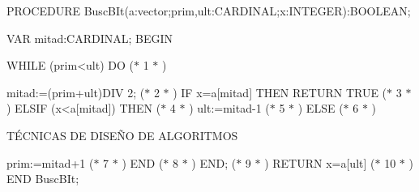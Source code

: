 \documentclass[12pt]{article}
\renewcommand{\_}{\kern-1.5pt\textunderscore\kern-1.5pt}
\begin{document}
\begin{adjustwidth}{0.97in}{0.66in}
{\fontsize{10pt}{12.0pt}\selectfont PROCEDURE BuscBIt(a:vector;prim,ult:CARDINAL;x:INTEGER):BOOLEAN; \par}\par

\end{adjustwidth}

\begin{adjustwidth}{0.97in}{3.72in}
{\fontsize{10pt}{12.0pt}\selectfont VAR mitad:CARDINAL; BEGIN \par}\par

\end{adjustwidth}

\begin{adjustwidth}{1.17in}{1.84in}
{\fontsize{10pt}{12.0pt}\selectfont WHILE (prim<ult) DO ($\ast$  1 $\ast$ ) \par}\par

\end{adjustwidth}

\begin{adjustwidth}{1.36in}{1.74in}
\begin{FlushRight}
{\fontsize{10pt}{12.0pt}\selectfont mitad:=(prim+ult)DIV 2; ($\ast$  2 $\ast$ ) IF x=a[mitad] THEN RETURN TRUE ($\ast$  3 $\ast$ ) ELSIF (x<a[mitad]) THEN ($\ast$  4 $\ast$ ) ult:=mitad-1 ($\ast$  5 $\ast$ ) ELSE ($\ast$  6 $\ast$ ) \par}
\end{FlushRight}\par

\end{adjustwidth}

{\fontsize{10pt}{12.0pt} {\fontsize{7pt}{8.4pt}\selectfont TÉCNICAS DE DISEÑO DE ALGORITMOS \par}\par}\par

\begin{FlushRight}
{\fontsize{10pt}{12.0pt}\selectfont prim:=mitad+1 ($\ast$  7 $\ast$ ) END ($\ast$  8 $\ast$ ) END; ($\ast$  9 $\ast$ ) RETURN x=a[ult] ($\ast$  10 $\ast$ ) END BuscBIt; \par}
\end{FlushRight}\par
\end{document}
